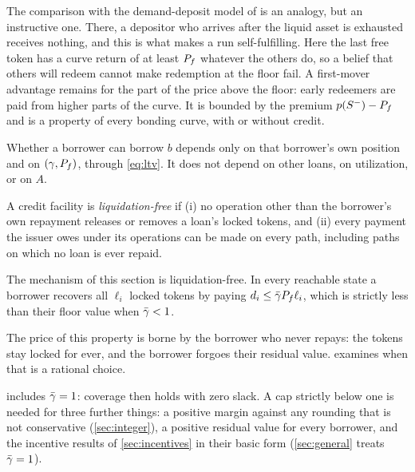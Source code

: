 The comparison with the demand-deposit model of \citet{diamond1983} is an analogy, but an instructive one. There, a depositor who arrives after the liquid asset is exhausted receives nothing, and this is what makes a run self-fulfilling. Here the last free token has a curve return of at least $P_f$ whatever the others do, so a belief that others will redeem cannot make redemption at the floor fail. A first-mover advantage remains for the part of the price above the floor: early redeemers are paid from higher parts of the curve. It is bounded by the premium $p(S^-)-P_f$ and is a property of every bonding curve, with or without credit.

\begin{corollary}\label{cor:nonrival}
Whether a borrower can borrow $b$ depends only on that borrower's own position and on $(\gamma,P_f)$, through \eqref{eq:ltv}. It does not depend on other loans, on utilization, or on $A$.
\end{corollary}

\begin{definition}\label{def:liqfree}
A credit facility is \emph{liquidation-free} if (i) no operation other than the borrower's own repayment releases or removes a loan's locked tokens, and (ii) every payment the issuer owes under its operations can be made on every path, including paths on which no loan is ever repaid.
\end{definition}

\begin{corollary}\label{cor:liqfree}
The mechanism of this section is liquidation-free. In every reachable state a borrower recovers all $\ell_i$ locked tokens by paying $d_i\le\bar\gamma P_f\ell_i$, which is strictly less than their floor value when $\bar\gamma<1$.
\end{corollary}

The price of this property is borne by the borrower who never repays: the tokens stay locked for ever, and the borrower forgoes their residual value.  examines when that is a rational choice.

\begin{remark}[The case $\gbar=1$]\label{rem:gbar1}
 includes $\gbar=1$: coverage then holds with zero slack. A cap strictly below one is needed for three further things: a positive margin against any rounding that is not conservative (\cref{sec:integer}), a positive residual value for every borrower, and the incentive results of \cref{sec:incentives} in their basic form (\cref{sec:general} treats $\gbar=1$).
\end{remark}

